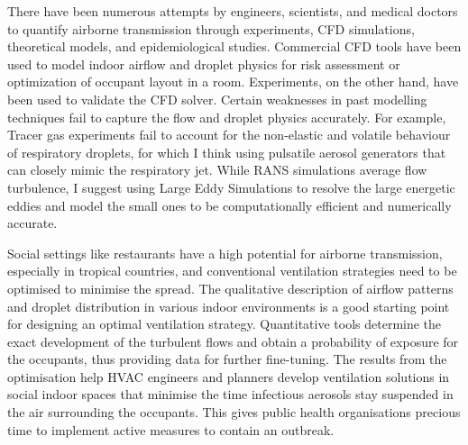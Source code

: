 \documentclass[a4paper,12pt]{elsarticle}
\begin{document}
There have been numerous attempts by engineers, scientists, and medical doctors to quantify airborne transmission through experiments, CFD simulations, theoretical models, and epidemiological studies. Commercial CFD tools have been used to model indoor airflow and droplet physics for risk assessment or optimization of occupant layout in a room. Experiments, on the other hand, have been used to validate the CFD solver. Certain weaknesses in past modelling techniques fail to capture the flow and droplet physics accurately. For example, Tracer gas experiments fail to account for the non-elastic and volatile behaviour of respiratory droplets, for which I think using pulsatile aerosol generators that can closely mimic the respiratory jet. While RANS simulations average flow turbulence, I suggest using Large Eddy Simulations to resolve the large energetic eddies and model the small ones to be computationally efficient and numerically accurate.

Social settings like restaurants have a high potential for airborne transmission, especially in tropical countries, and conventional ventilation strategies need to be optimised to minimise the spread. The qualitative description of airflow patterns and droplet distribution in various indoor environments is a good starting point for designing an optimal ventilation strategy. Quantitative tools determine the exact development of the turbulent flows and obtain a probability of exposure for the occupants, thus providing data for further fine-tuning. The results from the optimisation help HVAC engineers and planners develop ventilation solutions in social indoor spaces that minimise the time infectious aerosols stay suspended in the air surrounding the occupants. This gives public health organisations precious time to implement active measures to contain an outbreak.




  
 





\end{document}
